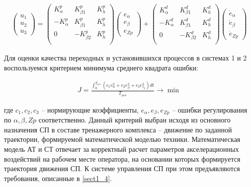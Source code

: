 \begin{equation}
\label{eq:ControllerSystem2}
\begin{aligned}
	\begin{pmatrix}
	u_1 \\ u_2 \\ u_3
	\end{pmatrix} =
	\begin{pmatrix}
	K_{\alpha}^p & K_{\beta1}^p & K_h^p \\
	-K_{\alpha}^p & K_{\beta1}^p & K_h^p \\
	0 & -K_{\beta2}^p & K_h^p \\
	\end{pmatrix}
	\begin{pmatrix}
	e_{\alpha} \\ e_{\beta} \\ e_{Zp}
	\end{pmatrix} +
	\begin{pmatrix}
	K_{\alpha}^d & K_{\beta1}^d & K_h^d \\
	-K_{\alpha}^d & K_{\beta1}^d & K_h^d \\
	0 & -K_{\beta2}^d & K_h^d \\
	\end{pmatrix}
	\begin{pmatrix}
	\dot{e}_{\alpha} \\ \dot{e}_{\beta} \\ \dot{e}_{Zp}
	\end{pmatrix}
\end{aligned}
\end{equation}

Для оценки качества переходных и установившихся процессов в системах 1 и 2 воспользуемся критерием минимума среднего квадрата ошибки:

\begin{equation}
\label{eq:KriteriaControlQuality}
\begin{aligned}
	J = \frac{\displaystyle \int_0^{T_{\text{уст}}} \left(c_1e_{\alpha}^2 + c_2e_{\beta}^2 + c_3e_{z_p}^2\right)dt}{T_{\text{уст}}} \rightarrow \min
\end{aligned}
\end{equation}

	где $c_1, c_2, c_3$ – нормирующие коэффициенты, $e_{\alpha}, e_{\beta}, e_{Zp}$ – ошибки регулирования по $\alpha, \beta, Zp$ соответственно.
Данный критерий выбран исходя из основного назначения СП в составе тренажерного комплекса -- движение по заданной траектории, формируемой математической моделью техники. Математическая модель АТ и СТ отвечает за корректный расчет параметров акселерационных воздействий на рабочем месте оператора, на основании которых формируется траектория движения СП. К системе управления СП при этом предъявляются требования, описанные в \ref{sect1_4}.

